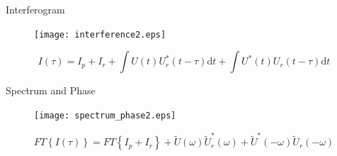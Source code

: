 \documentclass[11pt]{beamer}
\begin{document}
\begin{frame}{Interferogram}
\vspace{-15pt}
\begin{figure}
	\centering
	\texttt{[image: interference2.eps]}
\end{figure}
\vspace{-15pt}
\begin{equation}
	I(\tau) 	= I_p + I_r + \int U(t)U_r^*(t-\tau)\mathrm{d}t + \int U^*(t)U_r(t-\tau)\mathrm{d}t 
	\label{eq_inter}
\end{equation}
\end{frame}

\begin{frame}{Spectrum and Phase}
\vspace{-15pt}
\begin{figure}
	\centering
	\texttt{[image: spectrum\_phase2.eps]}
\end{figure}
\vspace{-5pt}
\begin{equation}
FT\left\lbrace I(\tau)\right\rbrace 	= 	FT\left\lbrace I_p + I_r \right\rbrace 
+ \tilde{U}(\omega)\tilde{U}_r^*(\omega) + \tilde{U}^*(-\omega)\tilde{U}_r(-\omega)
	\label{eq_fourier}
\end{equation}
\end{frame}

\end{document}
